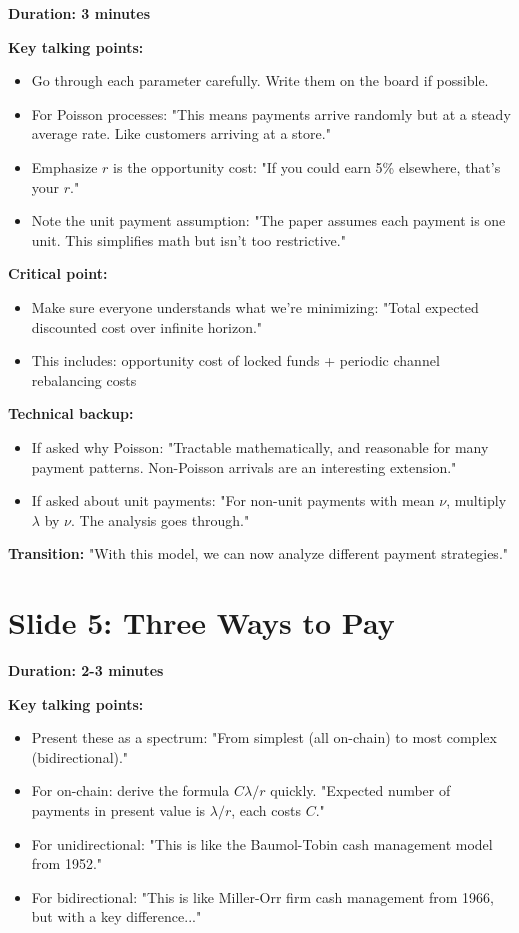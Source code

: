 \documentclass[11pt]{article}
\begin{document}
\textbf{Duration: 3 minutes}

\textbf{Key talking points:}
\begin{itemize}
    \item Go through each parameter carefully. Write them on the board if possible.
    \item For Poisson processes: "This means payments arrive randomly but at a steady average rate. Like customers arriving at a store."
    \item Emphasize $r$ is the opportunity cost: "If you could earn 5\% elsewhere, that's your $r$."
    \item Note the unit payment assumption: "The paper assumes each payment is one unit. This simplifies math but isn't too restrictive."
\end{itemize}

\textbf{Critical point:}
\begin{itemize}
    \item Make sure everyone understands what we're minimizing: "Total expected discounted cost over infinite horizon."
    \item This includes: opportunity cost of locked funds + periodic channel rebalancing costs
\end{itemize}

\textbf{Technical backup:}
\begin{itemize}
    \item If asked why Poisson: "Tractable mathematically, and reasonable for many payment patterns. Non-Poisson arrivals are an interesting extension."
    \item If asked about unit payments: "For non-unit payments with mean $\nu$, multiply $\lambda$ by $\nu$. The analysis goes through."
\end{itemize}

\textbf{Transition:} "With this model, we can now analyze different payment strategies."

\section*{Slide 5: Three Ways to Pay}

\textbf{Duration: 2-3 minutes}

\textbf{Key talking points:}
\begin{itemize}
    \item Present these as a spectrum: "From simplest (all on-chain) to most complex (bidirectional)."
    \item For on-chain: derive the formula $C\lambda/r$ quickly. "Expected number of payments in present value is $\lambda/r$, each costs $C$."
    \item For unidirectional: "This is like the Baumol-Tobin cash management model from 1952."
    \item For bidirectional: "This is like Miller-Orr firm cash management from 1966, but with a key difference..."
\end{itemize}
\end{document}
